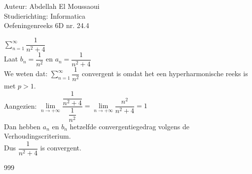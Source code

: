 \documentclass[a4paper]{article}
\begin{document}
  
\noindent \large Auteur: Abdellah El Moussaoui \\
\noindent \large Studierichting: Informatica\\
\noindent \large Oefeningenreeks 6D nr. 24.4\\

\medskip

\normalsize


$\displaystyle\sum_{n=1}^{\infty}\dfrac{1}{n^2+4}$\\

Laat $b_n = \dfrac{1}{n^2}$ en $a_n = \dfrac{1}{n^2+4}$\\

We weten dat: $\displaystyle \sum_{n=1}^{\infty}\dfrac{1}{n^2}$ convergent is omdat het een hyperharmonische reeks is met $p > 1$.\\

Aangezien: $\lim\limits_{n\to+\infty} \dfrac{\dfrac{1}{n^2+4}}{\dfrac{1}{n^2}} = \lim\limits_{n\to+\infty} \dfrac{n^2}{n^2+4} = 1$\\

Dan hebben $a_n$ en $b_n$ hetzelfde convergentiegedrag volgens de Verhoudingscriterium.\\

Dus $\dfrac{1}{n^2+4}$ is convergent.\\



\begin{thebibliography}{999}
\end{thebibliography}
\end{document}
